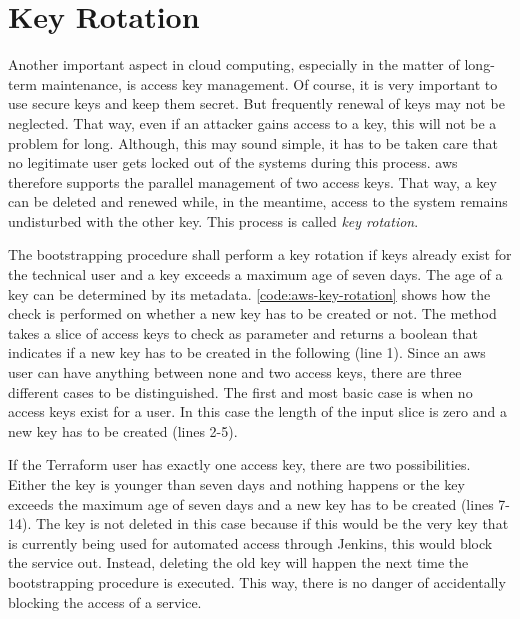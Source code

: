 


\section{Key Rotation}
Another important aspect in cloud computing, especially in the matter of long-term maintenance, is access key management.
Of course, it is very important to use secure keys and keep them secret.
But frequently renewal of keys may not be neglected.
That way, even if an attacker gains access to a key, this will not be a problem for long.
Although, this may sound simple, it has to be taken care that no legitimate user gets locked out of the systems during this process.
\ac{aws} therefore supports the parallel management of two access keys.
That way, a key can be deleted and renewed while, in the meantime, access to the system remains undisturbed with the other key.
This process is called \emph{key rotation}.

The bootstrapping procedure shall perform a key rotation if keys already exist for the technical user and a key exceeds a maximum age of seven days.
The age of a key can be determined by its metadata.
\autoref{code:aws-key-rotation} shows how the check is performed on whether a new key has to be created or not.
The method takes a slice of access keys to check as parameter and returns a boolean that indicates if a new key has to be created in the following (line 1).
Since an \ac{aws} user can have anything between none and two access keys, there are three different cases to be distinguished.
The first and most basic case is when no access keys exist for a user.
In this case the length of the input slice is zero and a new key has to be created (lines 2-5).

If the Terraform user has exactly one access key, there are two possibilities.
Either the key is younger than seven days and nothing happens or the key exceeds the maximum age of seven days and a new key has to be created (lines 7-14).
The key is not deleted in this case because if this would be the very key that is currently being used for automated access through Jenkins, this would block the service out.
Instead, deleting the old key will happen the next time the bootstrapping procedure is executed.
This way, there is no danger of accidentally blocking the access of a service.

